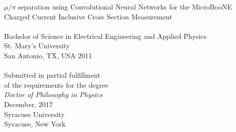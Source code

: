 %
%
%
%

\begin{titlepage}
\begin{center}
\vspace*{0.2cm}
\noindent\makebox[\linewidth]{\rule{\textwidth}{0.3pt}}
{\huge %
$\mu/\pi$ separation using Convolutional Neural Networks for the MicroBooNE Charged Current Inclusive Cross Section Measurement 
}
\noindent\makebox[\linewidth]{\rule{\textwidth}{0.3pt}}\\ %
\vspace{0.5cm}
\vspace{0.5cm}
\\[6pt]
Bachelor of Science in Electrical Engineering and Applied Physics\\
St. Mary's University\\
San Antonio, TX, USA 2011\\
\vspace{1.3cm}
\\[6pt]
Submitted in partial fulfillment\\
of the requirements for the degree\\
\emph{Doctor of Philosophy in Physics}\\
December, 2017\\
Syracuse University\\
Syracuse, New York

\end{center}
\end{titlepage}

